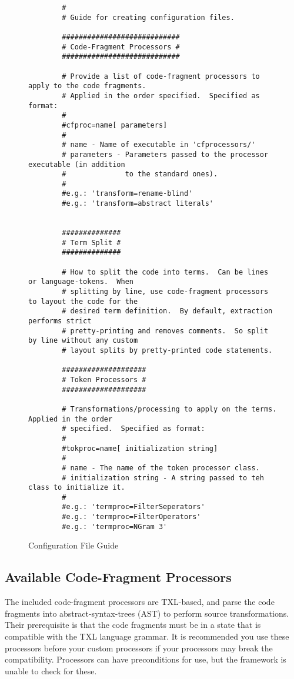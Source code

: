 \documentclass[]{article}
\begin{document}
	\begin{figure}
		\caption{Configuration File Guide} \label{fig:configguide}
		\begin{verbatim}
		#
		# Guide for creating configuration files.
		
		############################
		# Code-Fragment Processors #
		############################
		
		# Provide a list of code-fragment processors to apply to the code fragments.  
		# Applied in the order specified.  Specified as format:
		#
		#cfproc=name[ parameters]
		#
		# name - Name of executable in 'cfprocessors/'
		# parameters - Parameters passed to the processor executable (in addition
		#              to the standard ones).
		#
		#e.g.: 'transform=rename-blind'
		#e.g.: 'transform=abstract literals'
		
		
		##############
		# Term Split #
		##############
		
		# How to split the code into terms.  Can be lines or language-tokens.  When
		# splitting by line, use code-fragment processors to layout the code for the
		# desired term definition.  By default, extraction performs strict
		# pretty-printing and removes comments.  So split by line without any custom 
		# layout splits by pretty-printed code statements.
		
		####################
		# Token Processors #
		####################
		
		# Transformations/processing to apply on the terms.  Applied in the order
		# specified.  Specified as format:
		#
		#tokproc=name[ initialization string]
		#
		# name - The name of the token processor class.
		# initialization string - A string passed to teh class to initialize it.
		#
		#e.g.: 'termproc=FilterSeperators'
		#e.g.: 'termproc=FilterOperators'
		#e.g.: 'termproc=NGram 3'
		\end{verbatim}
	\end{figure}
	
	\subsection{Available Code-Fragment Processors}
	The included code-fragment processors are TXL-based, and parse the code fragments into abstract-syntax-trees (AST) to perform source transformations.  Their prerequisite is that the code fragments must be in a state that is compatible with the TXL language grammar. It is recommended you use these processors before your custom processors if your processors may break the compatibility.  Processors can have preconditions for use, but the framework is unable to
	check for these.\\
	
\end{document}
